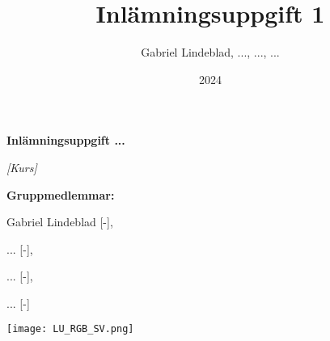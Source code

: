 \documentclass{report}
\title{Inlämningsuppgift 1}
\author{Gabriel Lindeblad, ..., ..., ...} %
\date{2024} %
\begin{document}

\begin{titlepage}

    \vspace*{2.5cm}
	\centering
	{\Huge\bfseries Inlämningsuppgift ...\par}
    \vspace{0.4cm}
    {\large\itshape [Kurs] \par}
	\vspace{1cm}
	\vfill

	\Large{\bfseries Gruppmedlemmar:\par } Gabriel Lindeblad [-], \par ... [-], \par
    ... [-], \par
    ... [-]


    \vspace{1.5cm}
    \texttt{[image: LU\_RGB\_SV.png]}
    \vspace*{0.5cm}

\end{titlepage}

\newpage


%
\end{document}
